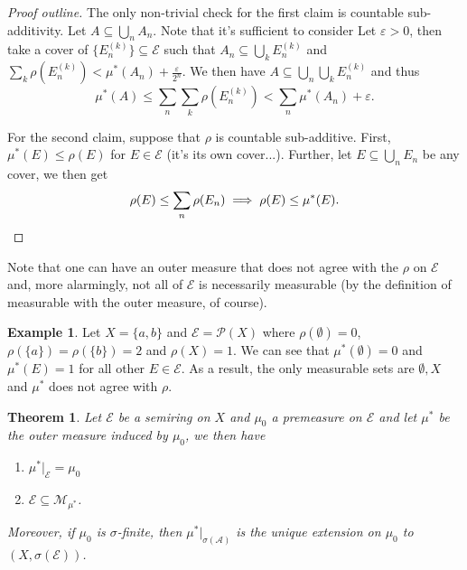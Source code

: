 \documentclass[letterpaper,12pt]{article}
\theoremstyle{definition}
\newtheorem{example}{Example}[section]
\theoremstyle{plain}
\newtheorem{thm}{Theorem}[section]
\theoremstyle{remark}
\begin{document}
\begin{proof}[Proof outline]
The only non-trivial check for the first claim is countable sub-additivity. Let $A \subseteq \bigcup_n A_n$. Note that it's sufficient to consider  Let $\varepsilon>0$, then take a cover of $\{E_n^{(k)}\}\subseteq \mathcal{E}$ such that $A_n\subseteq \bigcup_k E_n^{(k)}$ and $\sum_k \rho(E_n^{(k)}) < \mu^*(A_n)+\frac{\varepsilon}{2^n}$. We then have $A\subseteq \bigcup_n \bigcup_k E_n^{(k)}$ and thus
\[\mu^*(A)\leq \sum_n\sum_k \rho(E_n^{(k)}) < \sum_n \mu^*(A_n)+\varepsilon.\]

For the second claim, suppose that $\rho$ is countable sub-additive. First, $\mu^*(E)\leq \rho(E)$ for $E\in \mathcal{E}$ (it's its own cover...). Further, let $E\subseteq \bigcup_n E_n$ be any cover, we then get
\[\rho(E)\leq \sum_n\rho(E_n)\implies \rho(E)\leq \mu^*(E).\qedhere\]
\end{proof}

Note that one can have an outer measure that does not agree with the $\rho$ on $\mathcal{E}$ and, more alarmingly, not all of $\mathcal{E}$ is necessarily measurable (by the definition of measurable with the outer measure, of course).

\begin{example}
Let $X=\{a,b\}$ and $\mathcal{E} = \mathcal{P}(X)$ where $\rho(\emptyset)=0$, $\rho(\{a\}) = \rho(\{b\}) = 2$ and $\rho(X)=1$. We can see that $\mu^*(\emptyset)=0$ and $\mu^*(E)=1$ for all other $E\in \mathcal{E}$. As a result, the only measurable sets are $\emptyset,X$ and $\mu^*$ does not agree with $\rho$.
\end{example}

\begin{thm}
Let $\mathcal{E}$ be a semiring on $X$ and $\mu_0$ a premeasure on $\mathcal{E}$ and let $\mu^*$ be the outer measure induced by $\mu_0$, we then have
\begin{enumerate}
  \item $\mu^*\big|_{\mathcal{E}}=\mu_0$
  \item $\mathcal{E}\subseteq \mathcal{M}_{\mu^*}$.
\end{enumerate}
Moreover, if $\mu_0$ is $\sigma$-finite, then $\mu^*\big|_{\sigma(\mathcal{A})}$ is the unique extension on $\mu_0$ to $(X,\sigma(\mathcal{E}))$.
\end{thm}
\end{document}
